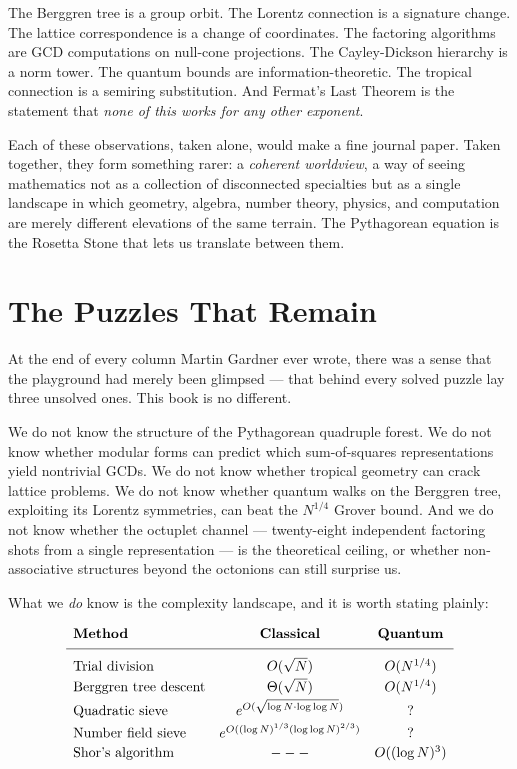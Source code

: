 The Berggren tree is a group orbit. The Lorentz connection is a signature change. The lattice correspondence is a change of coordinates. The factoring algorithms are GCD computations on null-cone projections. The Cayley-Dickson hierarchy is a norm tower. The quantum bounds are information-theoretic. The tropical connection is a semiring substitution. And Fermat's Last Theorem is the statement that \textit{none of this works for any other exponent}.

Each of these observations, taken alone, would make a fine journal paper. Taken together, they form something rarer: a \textit{coherent worldview}, a way of seeing mathematics not as a collection of disconnected specialties but as a single landscape in which geometry, algebra, number theory, physics, and computation are merely different elevations of the same terrain. The Pythagorean equation is the Rosetta Stone that lets us translate between them.


\bigskip


\section{The Puzzles That Remain}

At the end of every column Martin Gardner ever wrote, there was a sense that the playground had merely been glimpsed --- that behind every solved puzzle lay three unsolved ones. This book is no different.

We do not know the structure of the Pythagorean quadruple forest. We do not know whether modular forms can predict which sum-of-squares representations yield nontrivial GCDs. We do not know whether tropical geometry can crack lattice problems. We do not know whether quantum walks on the Berggren tree, exploiting its Lorentz symmetries, can beat the $N^{1/4}$ Grover bound. And we do not know whether the octuplet channel --- twenty-eight independent factoring shots from a single representation --- is the theoretical ceiling, or whether non-associative structures beyond the octonions can still surprise us.

What we \textit{do} know is the complexity landscape, and it is worth stating plainly:

\[
\begin{array}{lcc}
\textbf{Method} & \textbf{Classical} & \textbf{Quantum} \\[4pt]
\hline
\\[-6pt]
\text{Trial division} & O(\sqrt{N}) & O(N^{1/4}) \\[2pt]
\text{Berggren tree descent} & \Theta(\sqrt{N}) & O(N^{1/4}) \\[2pt]
\text{Quadratic sieve} & e^{O(\sqrt{\log N \cdot \log\log N})} & ? \\[2pt]
\text{Number field sieve} & e^{O((\log N)^{1/3}(\log\log N)^{2/3})} & ? \\[2pt]
\text{Shor's algorithm} & --- & O((\log N)^3) \\[2pt]
\index{Shor!algorithm}
\end{array}
\]


